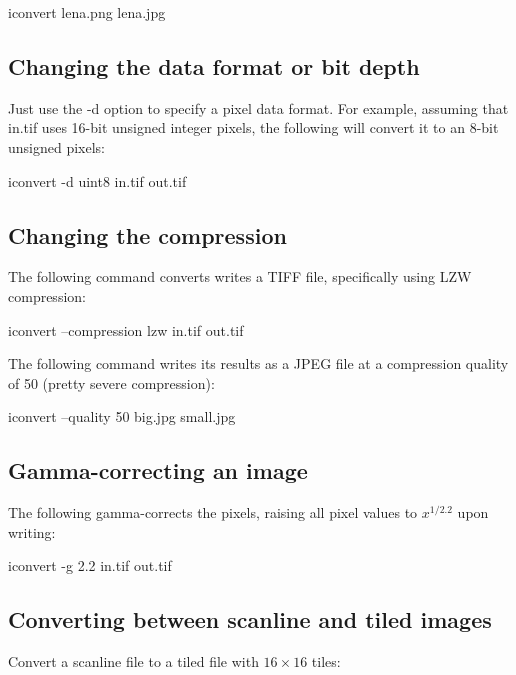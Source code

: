 \begin{code}
    iconvert lena.png lena.jpg
\end{code}

\subsection*{Changing the data format or bit depth}

Just use the {\cf -d} option to specify a pixel data format.  For
example, assuming that {\cf in.tif} uses 16-bit unsigned integer
pixels, the following will convert it to an 8-bit unsigned pixels:

\begin{code}
    iconvert -d uint8 in.tif out.tif
\end{code}

\subsection*{Changing the compression}

The following command converts writes a TIFF file, specifically using
LZW compression:

\begin{code}
    iconvert --compression lzw in.tif out.tif
\end{code}

The following command writes its results as a JPEG file at a 
compression quality of 50 (pretty severe compression):

\begin{code}
    iconvert --quality 50 big.jpg small.jpg
\end{code}

\subsection*{Gamma-correcting an image}

The following gamma-corrects the pixels, raising all pixel
values to $x^{1/2.2}$ upon writing:

\begin{code}
    iconvert -g 2.2 in.tif out.tif
\end{code}

\subsection*{Converting between scanline and tiled images}

Convert a scanline file to a tiled file with $16 \times 16$ tiles:

